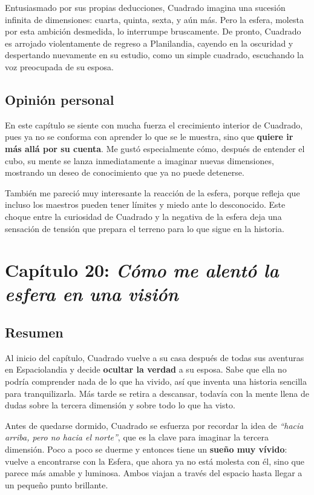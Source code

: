 \documentclass{article}
\begin{document}
Entusiasmado por sus propias deducciones, Cuadrado imagina una sucesión infinita de dimensiones: cuarta, quinta, sexta, y aún más. Pero la esfera, molesta por esta ambición desmedida, lo interrumpe bruscamente. De pronto, Cuadrado es arrojado violentamente de regreso a Planilandia, cayendo en la oscuridad y despertando nuevamente en su estudio, como un simple cuadrado, escuchando la voz preocupada de su esposa.

\subsection*{Opinión personal}

En este capítulo se siente con mucha fuerza el crecimiento interior de Cuadrado, pues ya no se conforma con aprender lo que se le muestra, sino que \textbf{quiere ir más allá por su cuenta}. Me gustó especialmente cómo, después de entender el cubo, su mente se lanza inmediatamente a imaginar nuevas dimensiones, mostrando un deseo de conocimiento que ya no puede detenerse.

También me pareció muy interesante la reacción de la esfera, porque refleja que incluso los maestros pueden tener límites y miedo ante lo desconocido. Este choque entre la curiosidad de Cuadrado y la negativa de la esfera deja una sensación de tensión que prepara el terreno para lo que sigue en la historia.


\section*{\textcolor{Tuscany}{Capítulo 20: \emph{Cómo me alentó la esfera en una visión}}}

\subsection*{Resumen}

Al inicio del capítulo, Cuadrado vuelve a su casa después de todas sus aventuras en Espaciolandia y decide \textbf{ocultar la verdad} a su esposa. Sabe que ella no podría comprender nada de lo que ha vivido, así que inventa una historia sencilla para tranquilizarla. Más tarde se retira a descansar, todavía con la mente llena de dudas sobre la tercera dimensión y sobre todo lo que ha visto.

Antes de quedarse dormido, Cuadrado se esfuerza por recordar la idea de \emph{“hacia arriba, pero no hacia el norte”}, que es la clave para imaginar la tercera dimensión. Poco a poco se duerme y entonces tiene un \textbf{sueño muy vívido}: vuelve a encontrarse con la Esfera, que ahora ya no está molesta con él, sino que parece más amable y luminosa. Ambos viajan a través del espacio hasta llegar a un pequeño punto brillante.
\end{document}
